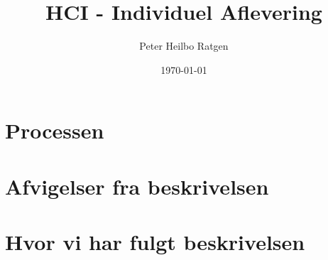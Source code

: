 \documentclass{article}
\title{HCI - Individuel Aflevering}
\author{Peter Heilbo Ratgen}
\date{\today}
\begin{document}
\maketitle
\section{Processen}

\section{Afvigelser fra beskrivelsen}




\section{Hvor vi har fulgt beskrivelsen}
\end{document}
